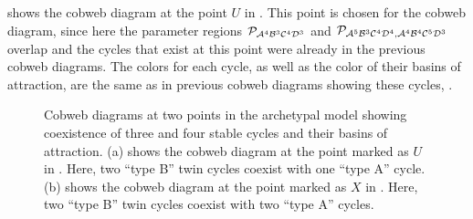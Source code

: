  shows the cobweb diagram at the point $U$ in .
This point is chosen for the cobweb diagram, since here the parameter regions $\mathcal{P}_{\mathcal{A}^4\mathcal{B}^3\mathcal{C}^4\mathcal{D}^3}$ and $\mathcal{P}_{\mathcal{A}^5\mathcal{B}^3\mathcal{C}^4\mathcal{D}^4, \mathcal{A}^4\mathcal{B}^4\mathcal{C}^5\mathcal{D}^3}$ overlap and the cycles that exist at this point were already in the previous cobweb diagrams.
The colors for each cycle, as well as the color of their basins of attraction, are the same as in previous cobweb diagrams showing these cycles, .

\begin{figure}
	\centering
	\caption[Cobweb diagrams of the archetypal model showing coexistence of up to four cycles]{
		Cobweb diagrams at two points in the archetypal model showing coexistence of three and four stable cycles and their basins of attraction.
		(a) shows the cobweb diagram at the point marked as $U$ in .
		Here, two ``type B'' twin cycles coexist with one ``type A'' cycle.
		(b) shows the cobweb diagram at the point marked as $X$ in .
		Here, two ``type B'' twin cycles coexist with two ``type A'' cycles.
	}
\end{figure}

